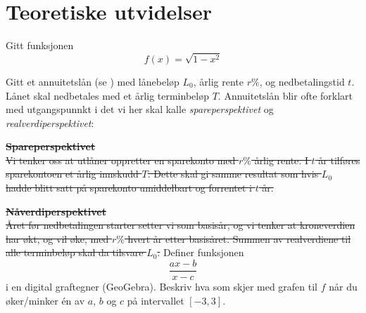 \newpage
\section{Teoretiske utvidelser}



Gitt funksjonen
\[ f(x)=\sqrt{1-x^2} \]
\newpage

Gitt et annuitetslån (se \am)  med lånebeløp $ L_0 $, årlig rente $ r\% $, og nedbetalingstid $ t $. Lånet skal nedbetales med et årlig terminbeløp $ T $. 
Annuitetslån blir ofte forklart med utgangspunnkt i det vi her skal kalle \textit{spareperspektivet} og \textit{realverdiperspektivet}: \os

\st{
	\textbf{Spareperspektivet}\\
	Vi tenker oss at utlåner oppretter en sparekonto med $ r\% $ årlig rente. I $ t $ år tilføres sparekontoen et årlig innskudd $ T $. Dette skal gi samme resultat som hvis $ L_0 $ hadde blitt satt på sparekonto umiddelbart og forrentet i $ t $ år.
} 

\st{
	\textbf{Nåverdiperspektivet} \\
	Året før nedbetalingen starter setter vi som basisår, og vi tenker at kroneverdien har økt, og vil øke, med $ r\% $ hvert år etter basisåret. Summen av realverdiene til alle terminbeløp skal da tilsvare $ L_0 $.
}
\newpage
{}
Definer funksjonen
\[ \frac{ax-b}{x-c} \]
i en digital graftegner (GeoGebra). Beskriv hva som skjer med grafen til $ f $ når du øker/minker én av $ a $, $ b $ og $ c $ på intervallet $ [-3, 3] $.


